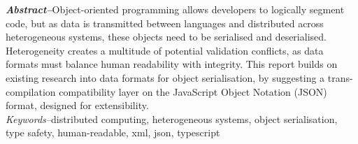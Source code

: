 \documentclass[../report.tex]{subfiles}
\begin{document}
{\textbf{\textit{Abstract--}}Object-oriented programming allows developers to logically segment code, but as data is transmitted between languages and distributed across heterogeneous systems, these objects need to be serialised and deserialised. Heterogeneity creates a multitude of potential validation conflicts, as data formats must balance human readability with integrity. This report builds on existing research into data formats for object serialisation, by suggesting a trans-compilation compatibility layer on the JavaScript Object Notation (JSON) format, designed for extensibility.} \\

\textit{Keywords--}distributed computing, heterogeneous systems, object serialisation, type safety, human-readable, xml, json, typescript
\end{document}
